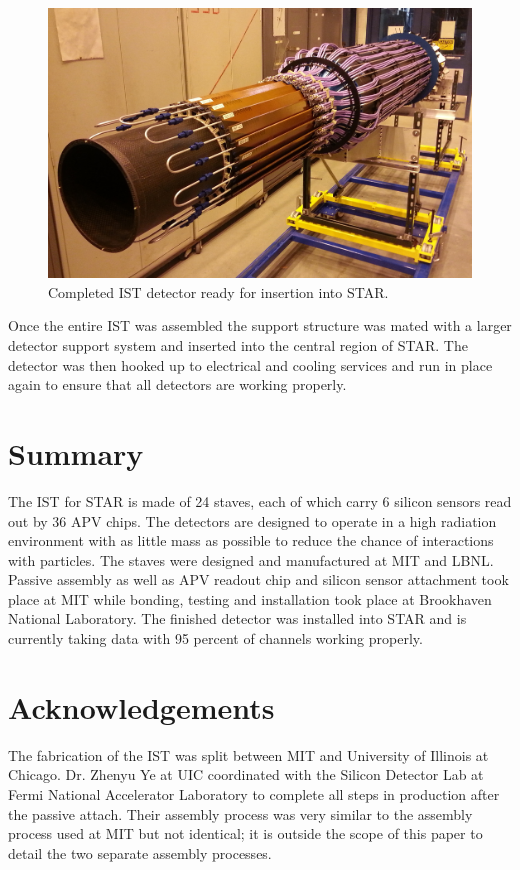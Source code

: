 \documentclass[1p,12pt]{elsarticle}
\begin{document}
\begin{figure}[h]
\begin{center}
\includegraphics[width=5in, keepaspectratio=true, angle=0]{graphics/full.jpg}
\caption{Completed IST detector ready for insertion into STAR.
\label{fig:full}}
\end{center}
\end{figure}
%
Once the entire IST was assembled the support structure was mated with a
larger detector support system and inserted into the central region of STAR.
The detector was then hooked up to electrical and cooling services and run in
place again to ensure that all detectors are working properly.

\section{Summary}
The IST for STAR is made of 24 staves, each of which carry 6 silicon sensors read
out by 36 APV chips. The detectors are designed to operate in a high radiation
environment with as little mass as possible to reduce the chance of interactions
with particles. The staves were designed and manufactured at MIT and LBNL.
Passive assembly as well as APV readout chip and silicon sensor attachment took
place at MIT while bonding, testing and installation took place at Brookhaven
National Laboratory. The finished detector was installed into STAR and is
currently taking data with 95 percent of channels working properly.

\section{Acknowledgements}
The fabrication of the IST was split between MIT and University of Illinois at Chicago.
Dr. Zhenyu Ye at UIC coordinated with the Silicon Detector Lab at Fermi National
Accelerator Laboratory to complete all steps in production after the passive
attach.  Their assembly process was very similar to the assembly process used
at MIT but not identical; it is outside the scope of this paper to detail the
two separate assembly processes.
\end{document}
